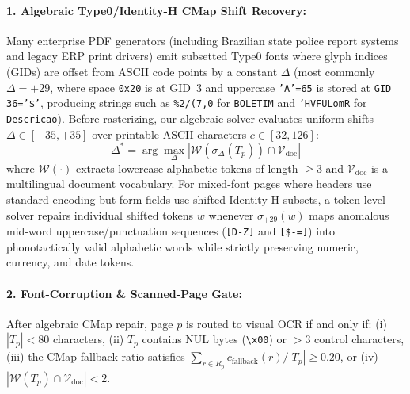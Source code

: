 \documentclass[10pt,twocolumn,letterpaper]{article}
\begin{document}
\paragraph{1. Algebraic Type0/Identity-H CMap Shift Recovery:}
Many enterprise PDF generators (including Brazilian state police report systems and legacy ERP print drivers) emit subsetted Type0 fonts where glyph indices (GIDs) are offset from ASCII code points by a constant $\Delta$ (most commonly $\Delta = +29$, where space \texttt{0x20} is at GID~3 and uppercase \texttt{'A'=65} is stored at \texttt{GID 36='\$'}, producing strings such as \texttt{\%2/(7,0} for \texttt{BOLETIM} and \texttt{'HVFULomR} for \texttt{Descricao}). Before rasterizing, our algebraic solver evaluates uniform shifts $\Delta \in [-35, +35]$ over printable ASCII characters $c \in [32, 126]$:
\begin{equation}
\Delta^* = \arg\max_{\Delta} \left| \mathcal{W}\!\left(\sigma_\Delta(T_p)\right) \cap \mathcal{V}_{\text{doc}} \right|
\end{equation}
where $\mathcal{W}(\cdot)$ extracts lowercase alphabetic tokens of length $\ge 3$ and $\mathcal{V}_{\text{doc}}$ is a multilingual document vocabulary. For mixed-font pages where headers use standard encoding but form fields use shifted Identity-H subsets, a token-level solver repairs individual shifted tokens $w$ whenever $\sigma_{+29}(w)$ maps anomalous mid-word uppercase/punctuation sequences (\texttt{[D-Z]} and \texttt{[\$-=]}) into phonotactically valid alphabetic words while strictly preserving numeric, currency, and date tokens.

\paragraph{2. Font-Corruption \& Scanned-Page Gate:}
After algebraic CMap repair, page $p$ is routed to visual OCR if and only if: (i) $|T_p| < 80$ characters, (ii) $T_p$ contains NUL bytes (\texttt{\textbackslash x00}) or $>3$ control characters, (iii) the CMap fallback ratio satisfies $\sum_{r \in R_p} c_{\text{fallback}}(r) / |T_p| \ge 0.20$, or (iv) $|\mathcal{W}(T_p) \cap \mathcal{V}_{\text{doc}}| < 2$.
\end{document}
